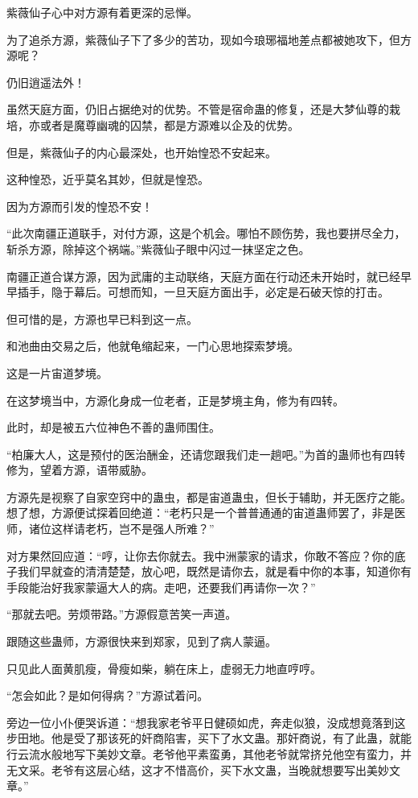 \begin{this_body}
紫薇仙子心中对方源有着更深的忌惮。

为了追杀方源，紫薇仙子下了多少的苦功，现如今琅琊福地差点都被她攻下，但方源呢？

仍旧逍遥法外！

虽然天庭方面，仍旧占据绝对的优势。不管是宿命蛊的修复，还是大梦仙尊的栽培，亦或者是魔尊幽魂的囚禁，都是方源难以企及的优势。

但是，紫薇仙子的内心最深处，也开始惶恐不安起来。

这种惶恐，近乎莫名其妙，但就是惶恐。

因为方源而引发的惶恐不安！

“此次南疆正道联手，对付方源，这是个机会。哪怕不顾伤势，我也要拼尽全力，斩杀方源，除掉这个祸端。”紫薇仙子眼中闪过一抹坚定之色。

南疆正道合谋方源，因为武庸的主动联络，天庭方面在行动还未开始时，就已经早早插手，隐于幕后。可想而知，一旦天庭方面出手，必定是石破天惊的打击。

但可惜的是，方源也早已料到这一点。

和池曲由交易之后，他就龟缩起来，一门心思地探索梦境。

这是一片宙道梦境。

在这梦境当中，方源化身成一位老者，正是梦境主角，修为有四转。

此时，却是被五六位神色不善的蛊师围住。

“柏廉大人，这是预付的医治酬金，还请您跟我们走一趟吧。”为首的蛊师也有四转修为，望着方源，语带威胁。

方源先是视察了自家空窍中的蛊虫，都是宙道蛊虫，但长于辅助，并无医疗之能。想了想，方源便试探着回绝道：“老朽只是一个普普通通的宙道蛊师罢了，非是医师，诸位这样请老朽，岂不是强人所难？”

对方果然回应道：“哼，让你去你就去。我中洲蒙家的请求，你敢不答应？你的底子我们早就查的清清楚楚，放心吧，既然是请你去，就是看中你的本事，知道你有手段能治好我家蒙逼大人的病。走吧，还要我们再请你一次？”

“那就去吧。劳烦带路。”方源假意苦笑一声道。

跟随这些蛊师，方源很快来到郑家，见到了病人蒙逼。

只见此人面黄肌瘦，骨瘦如柴，躺在床上，虚弱无力地直哼哼。

“怎会如此？是如何得病？”方源试着问。

旁边一位小仆便哭诉道：“想我家老爷平日健硕如虎，奔走似狼，没成想竟落到这步田地。他是受了那该死的奸商陷害，买下了水文蛊。那奸商说，有了此蛊，就能行云流水般地写下美妙文章。老爷他平素蛮勇，其他老爷就常挤兑他空有蛮力，并无文采。老爷有这层心结，这才不惜高价，买下水文蛊，当晚就想要写出美妙文章。”


\end{this_body}
